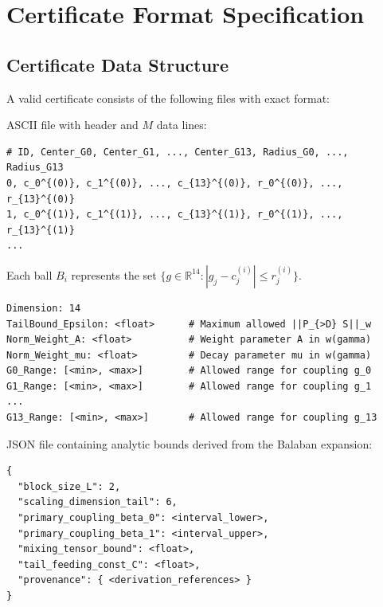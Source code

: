 \section{Certificate Format Specification}
\label{sec:certificate_format}

\subsection{Certificate Data Structure}
A valid certificate consists of the following files with exact format:

\begin{definition}
\label{def:balls_format}
ASCII file with header and $M$ data lines:
\begin{verbatim}
# ID, Center_G0, Center_G1, ..., Center_G13, Radius_G0, ..., Radius_G13
0, c_0^{(0)}, c_1^{(0)}, ..., c_{13}^{(0)}, r_0^{(0)}, ..., r_{13}^{(0)}
1, c_0^{(1)}, c_1^{(1)}, ..., c_{13}^{(1)}, r_0^{(1)}, ..., r_{13}^{(1)}
...
\end{verbatim}
Each ball $B_i$ represents the set $\{g \in \mathbb{R}^{14} : |g_j - c_j^{(i)}| \leq r_j^{(i)}\}$.
\end{definition}

\begin{definition}
\label{def:tube_format}
\begin{verbatim}
Dimension: 14
TailBound_Epsilon: <float>      # Maximum allowed ||P_{>D} S||_w
Norm_Weight_A: <float>          # Weight parameter A in w(gamma)
Norm_Weight_mu: <float>         # Decay parameter mu in w(gamma)
G0_Range: [<min>, <max>]        # Allowed range for coupling g_0
G1_Range: [<min>, <max>]        # Allowed range for coupling g_1
...
G13_Range: [<min>, <max>]       # Allowed range for coupling g_13
\end{verbatim}
\end{definition}

\begin{definition}
\label{def:constants_format}
JSON file containing analytic bounds derived from the Balaban expansion:
\begin{verbatim}
{
  "block_size_L": 2,
  "scaling_dimension_tail": 6,
  "primary_coupling_beta_0": <interval_lower>,
  "primary_coupling_beta_1": <interval_upper>,
  "mixing_tensor_bound": <float>,
  "tail_feeding_const_C": <float>,
  "provenance": { <derivation_references> }
}
\end{verbatim}
\end{definition}

